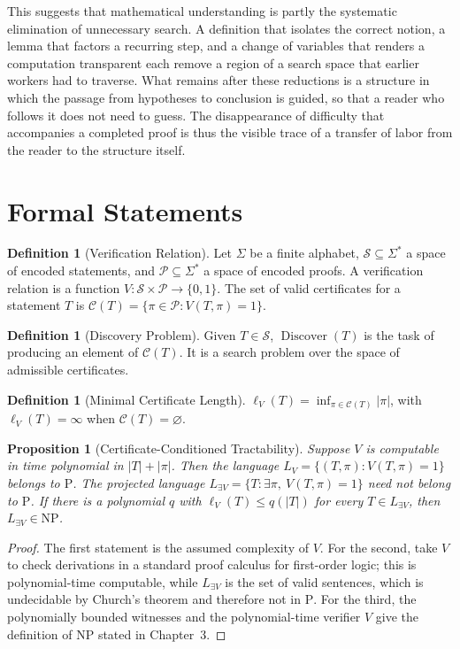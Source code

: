 \documentclass[11pt,letterpaper]{report}
\theoremstyle{plain}
\newtheorem{proposition}[theorem]{Proposition}
\theoremstyle{definition}
\newtheorem{definition}[theorem]{Definition}
\theoremstyle{remark}
\newcommand{\PTIME}{\mathrm{P}}
\newcommand{\NP}{\mathrm{NP}}
\begin{document}
This suggests that mathematical understanding is partly the systematic elimination of unnecessary search. A definition that isolates the correct notion, a lemma that factors a recurring step, and a change of variables that renders a computation transparent each remove a region of a search space that earlier workers had to traverse. What remains after these reductions is a structure in which the passage from hypotheses to conclusion is guided, so that a reader who follows it does not need to guess. The disappearance of difficulty that accompanies a completed proof is thus the visible trace of a transfer of labor from the reader to the structure itself.

\section{Formal Statements}

\begin{definition}[Verification Relation]
Let $\Sigma$ be a finite alphabet, $\mathcal S\subseteq\Sigma^{*}$ a space of encoded statements, and $\mathcal P\subseteq\Sigma^{*}$ a space of encoded proofs. A verification relation is a function $V:\mathcal S\times\mathcal P\to\{0,1\}$. The set of valid certificates for a statement $T$ is $\mathcal C(T)=\{\pi\in\mathcal P:V(T,\pi)=1\}$.
\end{definition}

\begin{definition}[Discovery Problem]
Given $T\in\mathcal S$, $\operatorname{Discover}(T)$ is the task of producing an element of $\mathcal C(T)$. It is a search problem over the space of admissible certificates.
\end{definition}

\begin{definition}[Minimal Certificate Length]
$\ell_V(T)=\inf_{\pi\in\mathcal C(T)}|\pi|$, with $\ell_V(T)=\infty$ when $\mathcal C(T)=\varnothing$.
\end{definition}

\begin{proposition}[Certificate-Conditioned Tractability]\label{pr:cctformal}
Suppose $V$ is computable in time polynomial in $|T|+|\pi|$. Then the language $L_V=\{(T,\pi):V(T,\pi)=1\}$ belongs to $\PTIME$. The projected language $L_{\exists V}=\{T:\exists\pi,\ V(T,\pi)=1\}$ need not belong to $\PTIME$. If there is a polynomial $q$ with $\ell_V(T)\le q(|T|)$ for every $T\in L_{\exists V}$, then $L_{\exists V}\in\NP$.
\end{proposition}
\begin{proof}
The first statement is the assumed complexity of $V$. For the second, take $V$ to check derivations in a standard proof calculus for first-order logic; this is polynomial-time computable, while $L_{\exists V}$ is the set of valid sentences, which is undecidable by Church's theorem and therefore not in $\PTIME$. For the third, the polynomially bounded witnesses and the polynomial-time verifier $V$ give the definition of $\NP$ stated in Chapter~3.
\end{proof}
\end{document}
